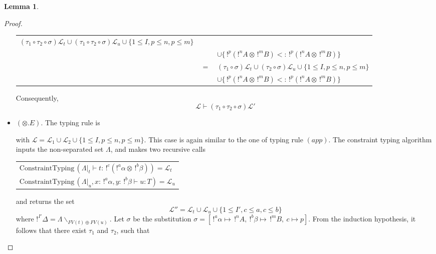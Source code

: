 \documentclass[10pt]{article}
\theoremstyle{plain}
\theoremstyle{definition}
\newtheorem{lemma}{Lemma}[section]
\newcommand{\pair}[2]{\langle #1, #2 \rangle}
\begin{document}
\begin{lemma}
\begin{proof}
\begin{itemize}
\begin{center}
\begin{tabular}{lcl}
				 			$(\tau_1 \circ \tau_2 \circ \sigma) \mathcal{L}_t \cup (\tau_1 \circ \tau_2 \circ \sigma) \mathcal{L}_u \cup
				 				\{1 \le I, p \le n, p \le m\}$ \\
				 	 	&& $\cup \{ \,!^p(!^nA \otimes \,!^mB) <: \,!^p(!^nA \otimes \,!^mB) \} $ \\
				 		& $=$ & $(\tau_1 \circ \sigma) \mathcal{L}_t \cup (\tau_2 \circ \sigma) \mathcal{L}_u \cup
				 				\{1 \le I, p \le n, p \le m\}$ \\
				 	 	&& $\cup \{ \,!^p(!^nA \otimes \,!^mB) <: \,!^p(!^nA \otimes \,!^mB) \} $
			 		\end{tabular}
			 		\end{center}
			 	Consequently,
			 		$$ \mathcal{L} \vdash (\tau_1 \circ \tau_2 \circ \sigma) \mathcal{L'} $$
			 		
			\item $(\otimes.E)$. The typing rule is
				\begin{prooftree}
					\BinaryInfC{$\Gamma_1, \Gamma_2, !^I\Delta \vdash_\mathcal{L} ~\text{let}~\pair{x}{y} = t ~\text{in}~ u : T$}
				\end{prooftree}
				with $\mathcal{L} = \mathcal{L}_1 \cup \mathcal{L}_2 \cup \{ 1 \le I, p \le n, p \le m \}$.
				This case is again similar to the one of typing rule $(app)$.
				The constraint typing algorithm inputs the non-separated set $\Lambda$, and makes two recursive calls
			 		\begin{center}
			 		\begin{tabular}{l}
			 			$\text{ConstraintTyping} \, (\Lambda |_t \vdash t : \, !^c(!^a\alpha \otimes \,!^b\beta)) = \mathcal{L}_t$ \\
			 			$\text{ConstraintTyping} \, (\Lambda |_u, x : \,!^a\alpha, y : \,!^b\beta \vdash u : T) = \mathcal{L}_u$
			 		\end{tabular}
			 		\end{center}
			 	and returns the set
			 		$$ \mathcal{L''} = \mathcal{L}_t \cup \mathcal{L}_u \cup \{ 1 \le I', c \le a, c \le b \} $$
			 	where $!^{I'} \Delta = \Lambda \backslash_{FV(t) \oplus FV(u)}$.
			 	Let $\sigma$ be the substitution $\sigma = [\, !^a\alpha \mapsto \,!^nA, ~!^b\beta \mapsto \,!^mB, ~ c \mapsto p ]$.
			 	From the induction hypothesis, it follows that there exist $\tau_1$ and $\tau_2$, such that
			 		\begin{center}

\end{center}
\end{itemize}
\end{proof}
\end{lemma}
\end{document}
